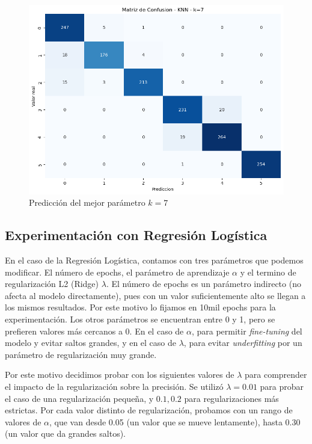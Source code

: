 \documentclass[conference]{IEEEtran}
\begin{document}
\begin{figure}[ht]
    \centering
    \includegraphics[width=1\linewidth]{knnk7.png}
    \caption{Predicción del mejor parámetro \(k = 7\)}
    \label{fig:knnevolution}
\end{figure}



\FloatBarrier
\subsection{Experimentación con Regresión Logística}
En el caso de la Regresión Logística, contamos con tres parámetros que podemos modificar. El número de epochs, el parámetro de aprendizaje $\alpha$ y el termino de regularización L2 (Ridge) $\lambda$. El número de epochs es un parámetro indirecto (no afecta al modelo directamente), pues con un valor suficientemente alto se llegan a los mismos resultados. Por este motivo lo fijamos en 10mil epochs para la experimentación. Los otros parámetros se encuentran entre 0 y 1, pero se prefieren valores más cercanos a 0. En el caso de $\alpha$, para permitir \textit{fine-tuning} del modelo y evitar saltos grandes, y en el caso de $\lambda$, para evitar \textit{underfitting} por un parámetro de regularización muy grande.

Por este motivo decidimos probar con los siguientes valores de $\lambda$ para comprender el impacto de la regularización sobre la precisión. Se utilizó $\lambda = 0.01$ para probar el caso de una regularización pequeña, y $0.1, 0.2$ para regularizaciones más estrictas. Por cada valor distinto de regularización, probamos con un rango de valores de $\alpha$, que van desde 0.05 (un valor que se mueve lentamente), hasta 0.30 (un valor que da grandes saltos).
\end{document}
